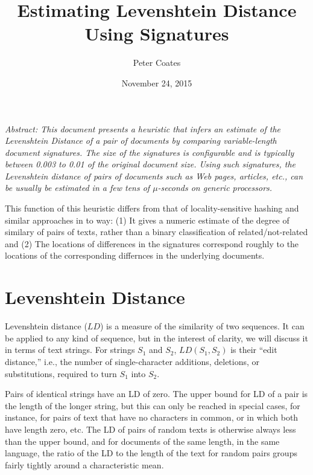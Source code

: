 \documentclass[html]{article}    %
\title{Estimating Levenshtein Distance Using Signatures}  %
\author{Peter Coates}    %
\date{November 24, 2015}   %
\begin{document}

\maketitle                 %

{ \em \noindent Abstract: 
This document presents a heuristic that infers an estimate of the Levenshtein Distance of 
a pair of documents by comparing variable-length document signatures. 
The size of the signatures is configurable and is typically between 0.003 to 0.01 of the original document size. 
Using such signatures, the Levenshtein distance of pairs of documents such as Web pages, articles, etc., can be 
usually be estimated in a few tens of $\mu$-seconds on generic processors.

This function of this heuristic differs from that of locality-sensitive hashing and similar approaches in to way: 
(1) It gives a numeric estimate of the degree of similary of pairs of texts, rather than a binary classification of related/not-related and
(2) The locations of differences in the signatures correspond roughly to the locations of the corresponding differnces in 
the underlying documents.
}

%
%
\section{Levenshtein Distance}

Levenshtein distance ($LD$) is a measure of the similarity of two sequences. 
It can be applied to any kind of sequence, but in the interest of clarity, we will discuss it in terms of text strings. 
For strings $S_{1}$ and $S_{2}$, $LD(S_{1},S_{2})$ is their ``edit distance,'' i.e., the number of single-character 
additions, deletions, or substitutions, required to turn  $S_{1}$ into $S_{2}$. 

Pairs of identical strings have an LD of zero. 
The upper bound for LD of a pair is the length of the longer string, but this can only be reached in special cases, for instance,
for pairs of text that have no characters in common, or in which both have length zero, etc.
The LD of pairs of random texts is otherwise always less than the upper bound, and 
for documents of the same length, in the same language, the ratio of the LD to the length of the text for 
random pairs groups fairly tightly around a characteristic mean.
\end{document}
